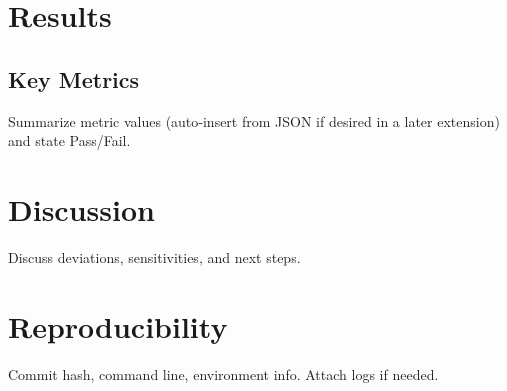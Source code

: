 \documentclass[11pt]{article}
\begin{document}
\section{Results}


\subsection{Key Metrics}
Summarize metric values (auto‑insert from JSON if desired in a later extension) and state Pass/Fail.


\section{Discussion}
Discuss deviations, sensitivities, and next steps.


\section*{Reproducibility}
Commit hash, command line, environment info. Attach logs if needed.
\end{document}
